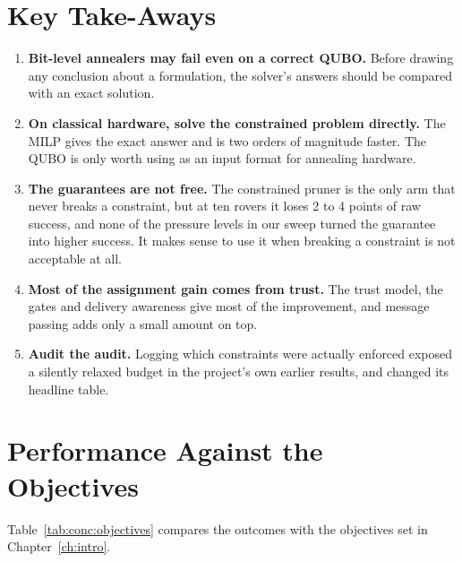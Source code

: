 \section{Key Take-Aways}

\begin{enumerate}[label=\arabic*.]
\item \textbf{Bit-level annealers may fail even on a correct QUBO.} Before
drawing any conclusion about a formulation, the solver's answers should be
compared with an exact solution.
\item \textbf{On classical hardware, solve the constrained problem directly.}
The MILP gives the exact answer and is two orders of magnitude faster. The
QUBO is only worth using as an input format for annealing hardware.
\item \textbf{The guarantees are not free.} The constrained pruner is the only
arm that never breaks a constraint, but at ten rovers it loses 2 to 4 points
of raw success, and none of the pressure levels in our sweep turned the
guarantee into higher success. It makes sense to use it when breaking a
constraint is not acceptable at all.
\item \textbf{Most of the assignment gain comes from trust.} The trust model,
the gates and delivery awareness give most of the improvement, and message
passing adds only a small amount on top.
\item \textbf{Audit the audit.} Logging which constraints were actually
enforced exposed a silently relaxed budget in the project's own earlier
results, and changed its headline table.
\end{enumerate}

\section{Performance Against the Objectives}

Table~\ref{tab:conc:objectives} compares the outcomes with the objectives set
in Chapter~\ref{ch:intro}.

